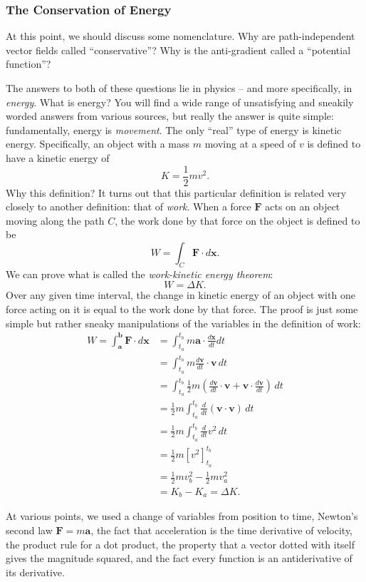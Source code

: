 \documentclass{myarticle}
\renewcommand{\vec}[1]{\mathbf{#1}}
\theoremstyle{nospace}
\newtheorem{old series theorem}{Theorem}
\newenvironment{series theorem}{\begin{mdframed}\begin{old series theorem}}{\end{old series theorem}\end{mdframed}}
\begin{document}
\subsubsection{The Conservation of Energy} \label{sec:conservation of energy}

At this point, we should discuss some nomenclature. Why are path-independent vector fields called ``conservative''? Why is the anti-gradient called a ``potential function''?

The answers to both of these questions lie in physics -- and more specifically, in \textit{energy}. What is energy? You will find a wide range of unsatisfying and sneakily worded answers from various sources, but really the answer is quite simple: fundamentally, energy is \textit{movement}. The only ``real'' type of energy is kinetic energy. Specifically, an object with a mass $m$ moving at a speed of $v$ is defined to have a kinetic energy of \[ K = \frac{1}{2}mv^2. \] Why this definition? It turns out that this particular definition is related very closely to another definition: that of \textit{work}. When a force $\vec{F}$ acts on an object moving along the path $C$, the work done by that force on the object is defined to be \[ W = \int_C \vec{F} \cdot d\vec{x}. \] We can prove what is called the \textit{work-kinetic energy theorem}: \[ W = \Delta K. \] Over any given time interval, the change in kinetic energy of an object with one force acting on it is equal to the work done by that force. The proof is just some simple but rather sneaky manipulations of the variables in the definition of work:
\begin{align*}
W = \int_\vec{a}^\vec{b} \vec{F} \cdot d\vec{x}
&= \int_{t_a}^{t_b} m\vec{a} \cdot \frac{d\vec{x}}{dt} dt \\
&= \int_{t_a}^{t_b} m\frac{d\vec{v}}{dt} \cdot \vec{v} \,dt \\
&= \int_{t_a}^{t_b} \frac{1}{2}m\left(\frac{d\vec{v}}{dt} \cdot \vec{v} + \vec{v} \cdot \frac{d\vec{v}}{dt}\right) \,dt \\
&= \frac{1}{2}m \int_{t_a}^{t_b} \frac{d}{dt} \left(\vec{v} \cdot \vec{v}\right) \,dt \\
&= \frac{1}{2}m \int_{t_a}^{t_b} \frac{d}{dt} v^2 \,dt \\
&= \frac{1}{2}m \left[v^2\right]_{t_a}^{t_b} \\
&= \frac{1}{2}mv_b^2 - \frac{1}{2}mv_a^2 \\
&= K_b - K_a = \Delta K.
\end{align*}

At various points, we used a change of variables from position to time, Newton's second law $\vec{F} = m\vec{a}$, the fact that acceleration is the time derivative of velocity, the product rule for a dot product, the property that a vector dotted with itself gives the magnitude squared, and the fact every function is an antiderivative of its derivative.
\end{document}
